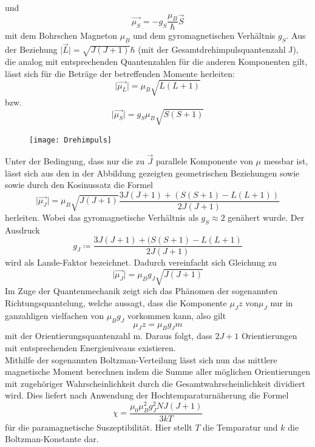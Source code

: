 und
\begin{equation*}
\vec{\mu_S}=-g_S\frac{\mu_B}{\hbar}\vec{S}
\end{equation*}
mit dem Bohrschen Magneton $\mu_B$ und dem gyromagnetischen Verhältnis $g_S$. Aus der Beziehung $\lvert \vec{L} \rvert=\sqrt{J(J+1)}\hbar$ (mit der Gesamtdrehimpulsquantenzahl J), die analog mit entsprechenden Quantenzahlen für die anderen Komponenten gilt, lässt sich für die Beträge der betreffenden Momente herleiten:
\begin{equation*}
\lvert \vec{\mu_L}\rvert=\mu_B\sqrt{L(L+1)}
\end{equation*}
bzw.
\begin{equation*}
\lvert \vec{\mu_S}\rvert=g_S\mu_B\sqrt{S(S+1)}
\end{equation*}
\begin{figure}[h]
    \centering
    \texttt{[image: Drehimpuls]}
    \label{Drehimpuls}
  \end{figure}
Unter der Bedingung, dass nur die zu $\vec{J}$ parallele Komponente von $\mu$ messbar ist, lässt sich aus den in der Abbildung gezeigten geometrischen Beziehungen sowie sowie durch den Kosinussatz die Formel
\begin{equation*}
\lvert \vec{\mu_J} \rvert=\mu_B\sqrt{J(J+1)}\frac{3J(J+1)+(S(S+1)-L(L+1))}{2J(J+1)}
\end{equation*}
herleiten. Wobei das gyromagnetische Verhältnis als $g_S\approx2$ genähert wurde. Der Ausdruck
\begin{equation}
g_J\coloneq\frac{3J(J+1)+(S(S+1)-L(L+1)}{2J(J+1)}
\end{equation}
wird als Lande-Faktor bezeichnet. Dadurch vereinfacht sich Gleichung zu
\begin{equation}
\lvert \vec{\mu_J} \rvert=\mu_Bg_J\sqrt{J(J+1)}
\end{equation}
Im Zuge der Quantenmechanik zeigt sich das Phänomen der sogenannten Richtungsquantelung, welche aussagt, dass die Komponente $\mu_Jz$ von$\mu_J$ nur in ganzahligen vielfachen von $\mu_Bg_J$ vorkommen kann, also gilt
\begin{equation*}
\mu_Jz=\mu_Bg_Jm
\end{equation*}
mit der Orientierungsquantenzahl m. Daraus folgt, dass $2J+1$ Orientierungen mit entsprechenden Energieniveaus existieren. \\ 
Mithilfe der sogenannten Boltzman-Verteilung lässt sich nun das mittlere magnetische Moment berechnen indem die Summe aller möglichen Orientierungen mit zugehöriger Wahrscheinlichkeit durch die Gesamtwahrscheinlichkeit dividiert wird. Dies liefert nach Anwendung der Hochtemparaturnäherung die Formel 
\begin{equation}
\chi=\frac{\mu_0\mu_B^2g_J^2NJ(J+1)}{3kT}
\end{equation}
für die paramagnetische Suszeptibilität. Hier stellt $T$ die Temparatur und $k$ die Boltzman-Konstante dar.
